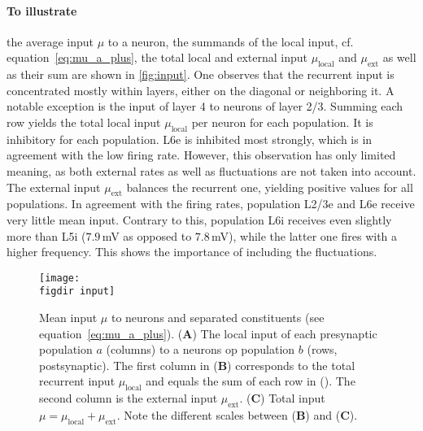 \paragraph{To illustrate} the average input $\mu$ to a neuron, the summands of the local input, cf.~%
equation~\eqref{eq:mu_a_plus}, the total local and external input $\mu_\text{local}$ and 
$\mu_\text{ext}$ as well as their sum are shown in \autoref{fig:input}.
One observes that the recurrent input is concentrated
mostly within layers, either on the diagonal or neighboring it. 
A notable exception is the input of layer 4 to neurons of layer 2/3.
Summing each row yields the total local input $\mu_\text{local}$ per neuron 
for each population. It is inhibitory for each population. L6e is inhibited most strongly, 
which is in agreement with the low firing rate. However, this observation has only
    limited meaning, as both external rates as well as fluctuations are not taken 
into account. The external input $\mu_\text{ext}$ balances the recurrent one, 
yielding positive values for all populations. In agreement with the firing rates, 
population L2/3e and L6e receive very little mean input. Contrary to this, 
population L6i receives even slightly more than L5i ($7.9$\,mV as opposed to $7.8$\,mV), 
while the latter one fires with a higher frequency. This shows the importance
of including the fluctuations. 

\begin{figure}[tb]
    \centering
    \texttt{[image: \\figdir input]}
    \caption[Mean input $\mu$]{
        Mean input $\mu$ to neurons and separated 
        constituents (see equation~\eqref{eq:mu_a_plus}).
        (\textbf{A}) The local input of each presynaptic population $a$ 
        (columns) to a neurons op population $b$ (rows, postsynaptic). 
        The first column in (\textbf{B})
        corresponds to the total recurrent input $\mu_\text{local}$
        and equals the sum of each row in (). The second column is 
        the external input $\mu_\text{ext}$.
        (\textbf{C}) Total input $\mu = \mu_\text{local} + \mu_\text{ext}$.
        Note the different scales between (\textbf{B}) and (\textbf{C}). 
    }
    \label{fig:input}
\end{figure}

